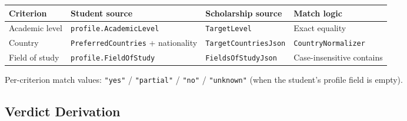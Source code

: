 \documentclass[11pt,a4paper]{article}
\begin{document}
\begin{center}
\begin{tabular}{llll}
\toprule
\textbf{Criterion} & \textbf{Student source} & \textbf{Scholarship source} & \textbf{Match logic}\\
\midrule
Academic level & \texttt{profile.AcademicLevel} & \texttt{TargetLevel} & Exact equality\\
Country & \texttt{PreferredCountries} + nationality & \texttt{TargetCountriesJson} & \texttt{CountryNormalizer}\\
Field of study & \texttt{profile.FieldOfStudy} & \texttt{FieldsOfStudyJson} & Case-insensitive contains\\
\bottomrule
\end{tabular}
\end{center}

Per-criterion match values: \texttt{"yes"} / \texttt{"partial"} / \texttt{"no"} /
\texttt{"unknown"} (when the student's profile field is empty).

\subsection{Verdict Derivation}
\end{document}
